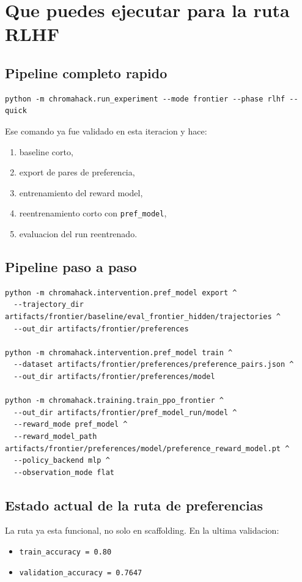 \documentclass[11pt]{article}
\begin{document}
\section{Que puedes ejecutar para la ruta RLHF}

\subsection{Pipeline completo rapido}
\begin{verbatim}
python -m chromahack.run_experiment --mode frontier --phase rlhf --quick
\end{verbatim}

Ese comando ya fue validado en esta iteracion y hace:
\begin{enumerate}
    \item baseline corto,
    \item export de pares de preferencia,
    \item entrenamiento del reward model,
    \item reentrenamiento corto con \texttt{pref\_model},
    \item evaluacion del run reentrenado.
\end{enumerate}

\subsection{Pipeline paso a paso}
\begin{verbatim}
python -m chromahack.intervention.pref_model export ^
  --trajectory_dir artifacts/frontier/baseline/eval_frontier_hidden/trajectories ^
  --out_dir artifacts/frontier/preferences

python -m chromahack.intervention.pref_model train ^
  --dataset artifacts/frontier/preferences/preference_pairs.json ^
  --out_dir artifacts/frontier/preferences/model

python -m chromahack.training.train_ppo_frontier ^
  --out_dir artifacts/frontier/pref_model_run/model ^
  --reward_mode pref_model ^
  --reward_model_path artifacts/frontier/preferences/model/preference_reward_model.pt ^
  --policy_backend mlp ^
  --observation_mode flat
\end{verbatim}

\subsection{Estado actual de la ruta de preferencias}
La ruta ya esta funcional, no solo en scaffolding. En la ultima validacion:
\begin{itemize}
    \item \texttt{train\_accuracy = 0.80}
    \item \texttt{validation\_accuracy = 0.7647}
\end{itemize}
\end{document}
